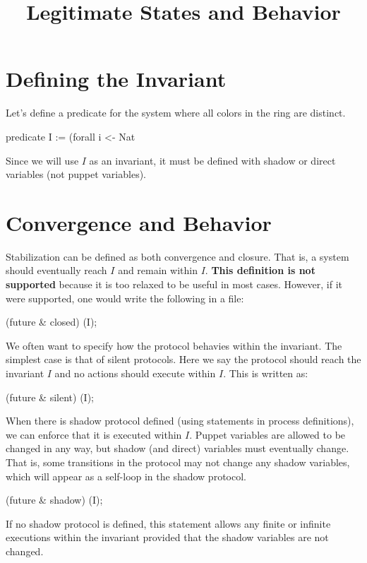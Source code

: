 
\title{Legitimate States and Behavior}
\date{}



\section{Defining the Invariant}

Let's define a predicate for the system where all colors in the ring are distinct.
\begin{code}
predicate I := (forall i <- Nat %
\end{code}

Since we will use $I$ as an invariant, it must be defined with shadow or direct variables (not puppet variables).

\section{Convergence and Behavior}

Stabilization can be defined as both convergence and closure.
That is, a system should eventually reach $I$ and remain within $I$.
\textbf{This definition is not supported} because it is too relaxed to be useful in most cases.
However, if it were supported, one would write the following in a  file:
\begin{code}
(future & closed) (I);
\end{code}

We often want to specify how the protocol behavies within the invariant.
The simplest case is that of silent protocols.
Here we say the protocol should reach the invariant $I$ and no actions should execute within $I$.
This is written as:
\begin{code}
(future & silent) (I);
\end{code}

When there is shadow protocol defined (using  statements in process definitions), we can enforce that it is executed within $I$.
Puppet variables are allowed to be changed in any way, but shadow (and direct) variables must eventually change.
That is, some transitions in the protocol may not change any shadow variables, which will appear as a self-loop in the shadow protocol.
\begin{code}
(future & shadow) (I);
\end{code}
If no shadow protocol is defined, this statement allows any finite or infinite executions within the invariant provided that the shadow variables are not changed.

